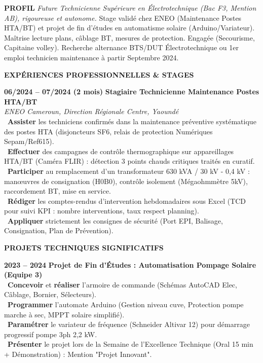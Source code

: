 \documentclass[11pt]{article}
\begin{document}
\begin{exoresolu}
\medskip
\noindent \textbf{PROFIL}
\emph{Future Technicienne Supérieure en Électrotechnique (Bac F3, Mention AB), rigoureuse et autonome.} Stage validé chez ENEO (Maintenance Postes HTA/BT) et projet de fin d'études en automatisme solaire (Arduino/Variateur). Maîtrise lecture plans, câblage BT, mesures de protection. Engagée (Secourisme, Capitaine volley). Recherche alternance BTS/DUT Électrotechnique ou 1er emploi technicien maintenance à partir Septembre 2024.

\medskip
\noindent \textbf{EXPÉRIENCES PROFESSIONNELLES \& STAGES}

\noindent \textbf{06/2024 -- 07/2024 (2 mois)} \hfill \textbf{Stagiaire Technicienne Maintenance Postes HTA/BT} \\
\textit{ENEO Cameroun, Direction Régionale Centre, Yaoundé} \\
\textbullet\ \textbf{Assister} les techniciens confirmés dans la maintenance préventive systématique des postes HTA (disjoncteurs SF6, relais de protection Numériques Sepam/Ref615). \\
\textbullet\ \textbf{Effectuer} des campagnes de contrôle thermographique sur appareillages HTA/BT (Caméra FLIR) : détection 3 points chauds critiques traités en curatif. \\
\textbullet\ \textbf{Participer} au remplacement d'un transformateur 630 kVA / 30 kV - 0,4 kV : manœuvres de consignation (H0B0), contrôle isolement (Mégaohmmètre 5kV), raccordement BT, mise en service. \\
\textbullet\ \textbf{Rédiger} les comptes-rendus d'intervention hebdomadaires sous Excel (TCD pour suivi KPI : nombre interventions, taux respect planning). \\
\textbullet\ \textbf{Appliquer} strictement les consignes de sécurité (Port EPI, Balisage, Consignation, Plan de Prévention).

\medskip
\noindent \textbf{PROJETS TECHNIQUES SIGNIFICATIFS}

\noindent \textbf{2023 -- 2024} \hfill \textbf{Projet de Fin d'Études : Automatisation Pompage Solaire (Equipe 3)} \\
\textbullet\ \textbf{Concevoir} et \textbf{réaliser} l'armoire de commande (Schémas AutoCAD Elec, Câblage, Bornier, Sélecteurs). \\
\textbullet\ \textbf{Programmer} l'automate Arduino (Gestion niveau cuve, Protection pompe marche à sec, MPPT solaire simplifié). \\
\textbullet\ \textbf{Paramétrer} le variateur de fréquence (Schneider Altivar 12) pour démarrage progressif pompe 3ph 2,2 kW. \\
\textbullet\ \textbf{Présenter} le projet lors de la Semaine de l'Excellence Technique (Oral 15 min + Démonstration) : Mention "Projet Innovant".


\end{exoresolu}
\end{document}
